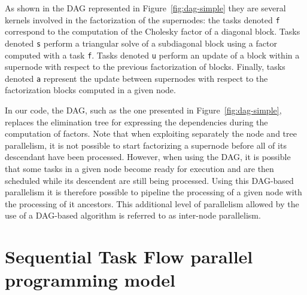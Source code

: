 \documentclass{article}
\begin{document}
As shown in the DAG represented in Figure~\ref{fig:dag-simple} they
are several kernels involved in the factorization of the supernodes:
the tasks denoted \texttt{f} correspond to the computation of the
Cholesky factor of a diagonal block. Tasks denoted \texttt{s} perform
a triangular solve of a subdiagonal block using a factor computed with
a task \texttt{f}. Tasks denoted \texttt{u} perform an update of a
block within a supernode with respect to the previous factorization of
blocks. Finally, tasks denoted \texttt{a} represent the update between
supernodes with respect to the factorization blocks computed in a
given node. 

In our code, the DAG, such as the one presented in
Figure~\ref{fig:dag-simple}, replaces the elimination tree for
expressing the dependencies during the computation of factors. Note
that when exploiting separately the node and tree parallelism, it is
not possible to start factorizing a supernode before all of its
descendant have been processed. However, when using the DAG, it is
possible that some tasks in a given node become ready for execution
and are then scheduled while its descendent are still being
processed. Using this DAG-based parallelism it is therefore possible
to pipeline the processing of a given node with the processing of it
ancestors. This additional level of parallelism allowed by the use of
a DAG-based algorithm is referred to as inter-node parallelism.
 
\section{Sequential Task Flow parallel programming model}\label{sec:runtime}
\end{document}
